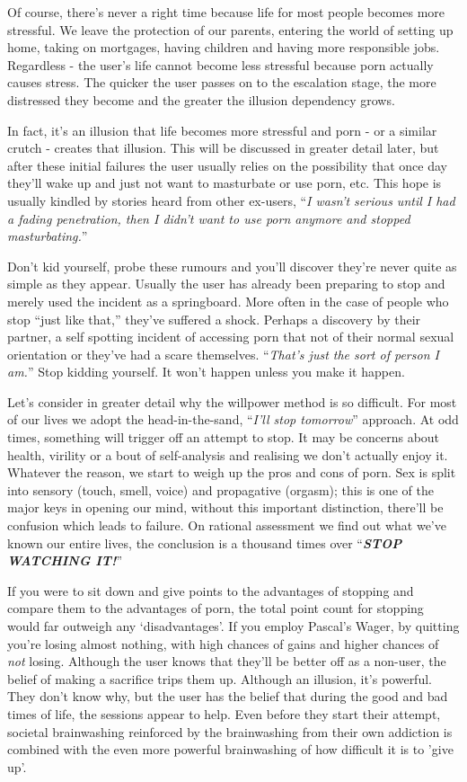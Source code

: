 \documentclass[
]{book}
\begin{document}
Of course, there's never a right time because life for most people becomes more stressful. We leave the protection of our parents, entering the world of setting up home, taking on mortgages, having children and having more responsible jobs. Regardless - the user's life cannot become less stressful because porn actually causes stress. The quicker the user passes on to the escalation stage, the more distressed they become and the greater the illusion dependency grows.

In fact, it's an illusion that life becomes more stressful and porn - or a similar crutch - creates that illusion. This will be discussed in greater detail later, but after these initial failures the user usually relies on the possibility that once day they'll wake up and just not want to masturbate or use porn, etc. This hope is usually kindled by stories heard from other ex-users, ``\emph{I wasn't serious until I had a fading penetration, then I didn't want to use porn anymore and stopped masturbating.}''

Don't kid yourself, probe these rumours and you'll discover they're never quite as simple as they appear. Usually the user has already been preparing to stop and merely used the incident as a springboard. More often in the case of people who stop ``just like that,'' they've suffered a shock. Perhaps a discovery by their partner, a self spotting incident of accessing porn that not of their normal sexual orientation or they've had a scare themselves. ``\emph{That's just the sort of person I am.}'' Stop kidding yourself. It won't happen unless you make it happen.

Let's consider in greater detail why the willpower method is so difficult. For most of our lives we adopt the head-in-the-sand, ``\emph{I'll stop tomorrow}'' approach. At odd times, something will trigger off an attempt to stop. It may be concerns about health, virility or a bout of self-analysis and realising we don't actually enjoy it. Whatever the reason, we start to weigh up the pros and cons of porn. Sex is split into sensory (touch, smell, voice) and propagative (orgasm); this is one of the major keys in opening our mind, without this important distinction, there'll be confusion which leads to failure. On rational assessment we find out what we've known our entire lives, the conclusion is a thousand times over ``\textbf{\emph{STOP WATCHING IT!}}''

If you were to sit down and give points to the advantages of stopping and compare them to the advantages of porn, the total point count for stopping would far outweigh any `disadvantages'. If you employ Pascal's Wager, by quitting you're losing almost nothing, with high chances of gains and higher chances of \emph{not} losing. Although the user knows that they'll be better off as a non-user, the belief of making a sacrifice trips them up. Although an illusion, it's powerful. They don't know why, but the user has the belief that during the good and bad times of life, the sessions appear to help. Even before they start their attempt, societal brainwashing reinforced by the brainwashing from their own addiction is combined with the even more powerful brainwashing of how difficult it is to 'give up'.
\end{document}
